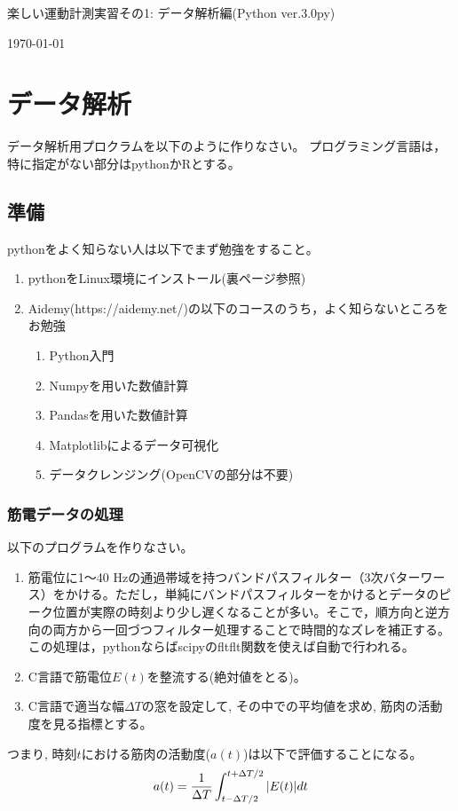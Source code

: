 \documentclass{jsarticle}
\def\version{3.0py}
\begin{document}
\begin{center}
  {\LARGE 楽しい運動計測実習その1: データ解析編(Python ver.\version)}
\end{center}
\begin{flushright}
\today
\end{flushright}

\section{データ解析}
データ解析用プロクラムを以下のように作りなさい。
プログラミング言語は，特に指定がない部分はpythonかRとする。

\subsection{準備}
pythonをよく知らない人は以下でまず勉強をすること。
\begin{enumerate}
	\item pythonをLinux環境にインストール(裏ページ参照)
	\item Aidemy(https://aidemy.net/)の以下のコースのうち，よく知らないところをお勉強
	\begin{enumerate}
		\item Python入門
		\item Numpyを用いた数値計算
 		\item Pandasを用いた数値計算
 		\item Matplotlibによるデータ可視化
 		\item データクレンジング(OpenCVの部分は不要)
	\end{enumerate}
\end{enumerate}


\subsubsection{筋電データの処理}
以下のプログラムを作りなさい。
\begin{enumerate}
\item 筋電位に1〜40 Hzの通過帯域を持つバンドパスフィルター（3次バターワース）をかける。ただし，単純にバンドパスフィルターをかけるとデータのピーク位置が実際の時刻より少し遅くなることが多い。そこで，順方向と逆方向の両方から一回づつフィルター処理することで時間的なズレを補正する。この処理は，pythonならばscipyのfltflt関数を使えば自動で行われる。
\item C言語で筋電位$E(t)$を整流する(絶対値をとる)。
\item C言語で適当な幅$\Delta T$の窓を設定して, その中での平均値を求め, 筋肉の活動度を見る指標とする。
\end{enumerate}
つまり, 時刻$t$における筋肉の活動度($a(t)$)は以下で評価することになる。
\begin{align}
  a(t)=\frac{1}{\Delta T}\int_{t-\Delta T/2}^{t+\Delta T/2}|E(t)|dt\notag
\end{align}
\end{document}
